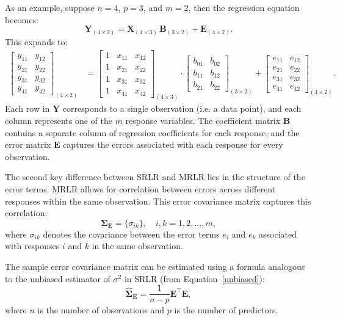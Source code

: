 \documentclass[11pt]{report} %
\begin{document}
As an example, suppose \( n = 4 \), \( p = 3 \), and \( m = 2 \), then the regression equation becomes:
\[
\mathbf{Y}_{(4 \times 2)} = \mathbf{X}_{(4 \times 3)} \, \mathbf{B}_{(3 \times 2)} + \mathbf{E}_{(4 \times 2)}.
\label{MRR_explicit}
\]
This expands to:
\[
\begin{aligned}
\begin{bmatrix}
y_{11} & y_{12} \\
y_{21} & y_{22} \\
y_{31} & y_{32} \\
y_{41} & y_{42}
\end{bmatrix}_{(4 \times 2)}
&=
\begin{bmatrix}
1 & x_{11} & x_{12} \\
1 & x_{21} & x_{22} \\
1 & x_{31} & x_{32} \\
1 & x_{41} & x_{42}
\end{bmatrix}_{(4 \times 3)}
\cdot
\begin{bmatrix}
b_{01} & b_{02} \\
b_{11} & b_{12} \\
b_{21} & b_{22}
\end{bmatrix}_{(3 \times 2)}
+
\begin{bmatrix}
e_{11} & e_{12} \\
e_{21} & e_{22} \\
e_{31} & e_{32} \\
e_{41} & e_{42}
\end{bmatrix}_{(4 \times 2)}.
\end{aligned}
\]
Each row in \( \mathbf{Y} \) corresponds to a single observation (i.e. a data point), and each column represents one of the \( m \) response variables. The coefficient matrix \( \mathbf{B} \) contains a separate column of regression coefficients for each response, and the error matrix \( \mathbf{E} \) captures the errors associated with each response for every observation.

The second key difference between SRLR and MRLR lies in the structure of the error terms. MRLR allows for correlation between errors across different responses within the same observation. This error covariance matrix captures this correlation:
\[ \mathbf{\Sigma_E} = \{\sigma_{ik}\}, \quad i, k = 1, 2, \dots, m,\] 
where \( \sigma_{ik} \) denotes the covariance between the error terms \( e_i \) and \( e_k \) associated with responses \( i \) and \( k \) in the same observation.\cite{johnson2013_chapter77} 

The sample error covariance matrix can be estimated using a formula analogous to the unbiased estimator of $\sigma^2$ in SRLR (from Equation~\ref{unbiased}):
\[
\mathbf{\hat{\Sigma}_E} = \frac{1}{n-p}\mathbf{E}^\top \mathbf{E},
\]
where $n$ is the number of observations and $p$ is the number of predictors.
\end{document}
